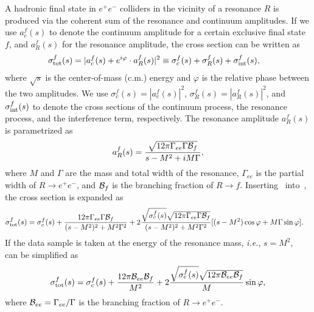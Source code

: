 \documentclass[%
preprint,
 amsmath,amssymb,
 aps,
]{revtex4-2}
\newcommand{\br}{{\cal B}}
\newcommand{\EE}{e^+e^-}
\begin{document}
A hadronic final state in $\EE$ colliders in the vicinity of a resonance $R$ is 
produced via the coherent sum of the resonance and continuum amplitudes. If 
we use $a_c^f(s)$ to denote the continuum amplitude for a certain exclusive final 
state $f$, and $a_{R}^{f}(s)$ for the resonance amplitude, the cross section can be 
written as 
\begin{align}\label{eq1:born-cs}
    \sigma_{\rm tot}^f(s)&=|a_{c}^f(s)+ e^{i\varphi}\cdot a_{R}^f(s)|^2 
    \equiv \sigma_{c}^{f}(s)+\sigma_{R}^{f}(s)+\sigma_{\rm int}^f(s),
\end{align}
where $\sqrt{s}$ is the center-of-mass (c.m.) energy and $\varphi$ is the 
relative phase between the two amplitudes. We use 
$\sigma_{c}^f(s)=|a_{c}^{f}(s)|^2$, $\sigma_{R}^f(s)=|a_{R}^{f}(s)|^2$, and $\sigma_{\rm int}^f(s)$ 
to denote the cross sections of the continuum process, the resonance process, 
and the interference term, respectively. 
The resonance amplitude $a_{R}^f(s)$ is parametrized as 
\begin{equation}\label{eq:aR}
    a_{R}^f(s)=\frac{\sqrt{12\pi\Gamma_{ee}\Gamma\br_f}}
    {s-M^{2}+i M \Gamma},
\end{equation}
where $M$ and $\Gamma$ are the mass and total width of the resonance, 
$\Gamma_{ee}$ is the partial width of $R\to \EE$, and $\br_f$ is the branching 
fraction of $R\to f$. 
Inserting~ into~, the cross section is expanded as 
\begin{align}\label{eq:born-cs-expand}
    \sigma_{\rm tot}^f(s) &= \sigma_{c}^{f}(s) 
    +\frac{12\pi \Gamma_{ee}\Gamma\br_f}{(s-M^2)^2+M^2\Gamma^2} + 2 \frac{\sqrt{\sigma_{c}^f(s)}\sqrt{12\pi\Gamma_{ee}\Gamma\br_f}}
    {(s-M^2)^2+M^2\Gamma^2}
   [(s-M^2)\cos\varphi+M\Gamma\sin\varphi].
\end{align}
If the data sample is taken at the energy of the resonance mass, {\it i.e.}, 
$s=M^2$,~ can be simplified as 
\begin{equation}\label{eq:born-cs-simplify}
    \sigma_{\rm tot}^f(s) = \sigma_{c}^{f}(s) +\frac{12\pi \br_{ee}\br_f}{M^2} 
    + 2 \frac{\sqrt{\sigma_{c}^f(s)}\sqrt{12\pi\br_{ee}\br_f}}{M}\sin\varphi,
\end{equation}
where $\br_{ee}=\Gamma_{ee}/\Gamma$ is the branching fraction of $R\to \EE$.
\end{document}
